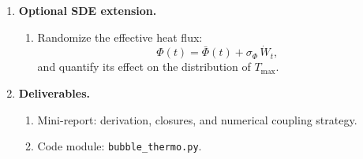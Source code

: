 \documentclass[11pt]{article}
\begin{document}
\begin{enumerate}
		\item \textbf{Optional SDE extension.}
		\begin{enumerate}
			\item Randomize the effective heat flux:
			\[
			\Phi(t)=\bar\Phi(t)+\sigma_{\Phi}\,\dot W_t,
			\]
			and quantify its effect on the distribution of $T_{\max}$.
		\end{enumerate}
		
		\item \textbf{Deliverables.}
		\begin{enumerate}
			\item Mini-report: derivation, closures, and numerical coupling strategy.
			\item Code module: \texttt{bubble\_thermo.py}.
		\end{enumerate}
	\end{enumerate}
	
	\newpage
	
\end{document}
